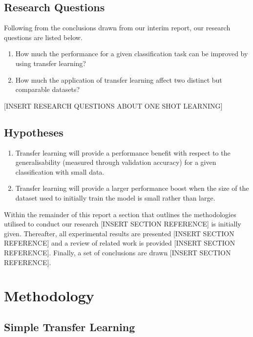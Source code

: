 \documentclass{article}
\begin{document}
\subsection{Research Questions}
\label{sec:questions}
Following from the conclusions drawn from our interim report, our research questions are listed below.

\begin{enumerate}
  \item How much the performance for a given classification task can be improved by using transfer learning?  
  \item How much the application of transfer learning affect two distinct but comparable datasets?
\end{enumerate}

[INSERT RESEARCH QUESTIONS ABOUT ONE SHOT LEARNING]

\subsection{Hypotheses}
\label{sec:hypotheses}
\begin{enumerate}[label=\textbf{H.\arabic*}]
  \item \label{h:1} Transfer learning will provide a performance benefit with respect to the generalisability (measured through validation accuracy) for a given classification with small data.
  \item \label{h:2} Transfer learning will provide a larger performance boost when the size of the dataset used to initially train the model is small rather than large.
 \end{enumerate}

Within the remainder of this report a section that outlines the methodologies utilised to conduct our research [INSERT SECTION REFERENCE] is initially given. Thereafter, all experimental results are presented [INSERT SECTION REFERENCE] and a review of related work is provided [INSERT SECTION REFERENCE]. Finally, a set of conclusions are drawn [INSERT SECTION REFERENCE].

\section{Methodology}
\label{sec:methodology}

\subsection{Simple Transfer Learning}
\label{sec:transferlearninng}
\end{document}
